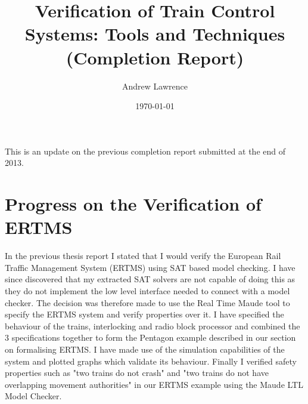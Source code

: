 \documentclass{article}
\title{Verification of Train Control Systems: Tools and Techniques (Completion Report)}
\date{\today}
\author{ 
   Andrew Lawrence}
\begin{document}
\maketitle
This is an update on the  previous completion report submitted at the end of 2013.



\section{Progress on the Verification of ERTMS}
In the previous thesis report I stated that I would verify the European Rail Traffic Management System (ERTMS) using SAT based model checking. I have since discovered that my extracted SAT solvers are not capable of doing this as they do not implement the low level interface needed to connect with a model checker. The decision was therefore made to use the Real Time Maude tool to specify the ERTMS system and verify properties over it. I have specified the behaviour of the trains, interlocking and radio block processor and combined the 3 specifications together to form the Pentagon example described in our section on formalising ERTMS. I have made use of the simulation capabilities of the system and plotted graphs which validate its behaviour. Finally I verified safety properties such as "two trains do not crash" and "two trains do not have overlapping movement authorities" in our ERTMS example using the Maude LTL Model Checker.
\end{document}
